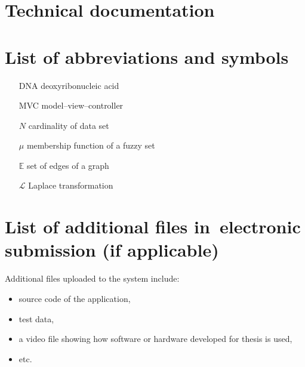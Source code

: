 \documentclass[a4paper,twoside,12pt]{book}
\begin{document}
\backmatter 


\begin{appendices}

\chapter{Technical documentation}

\chapter{List of abbreviations and symbols}

\begin{itemize}
\item[DNA] deoxyribonucleic acid
\item[MVC] model--view--controller 
\item[$N$] cardinality of data set
\item[$\mu$] membership function of a fuzzy set
\item[$\mathbb{E}$] set of edges of a graph
\item[$\mathcal{L}$] Laplace transformation
\end{itemize}

\chapter{List of additional files in~electronic submission (if applicable)}

Additional files uploaded to the system include:
\begin{itemize}
\item source code of the application,
\item test data,
\item a video file showing how software or hardware developed for thesis is used,
\item etc.
\end{itemize}

\listoffigures
{}
\listoftables
{}
	
\end{appendices}
\end{document}
